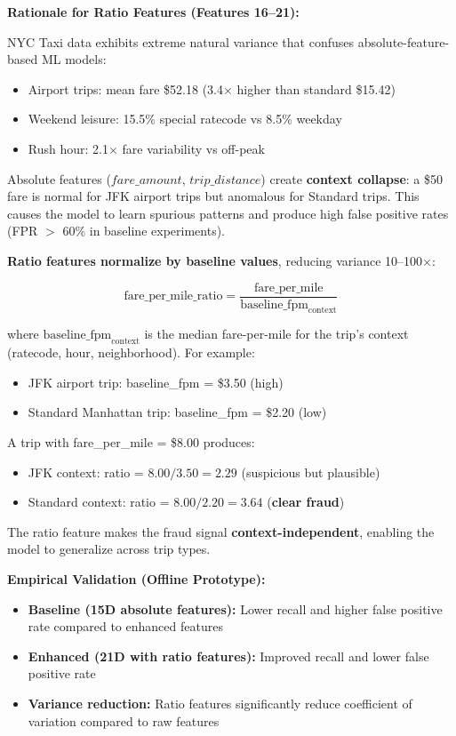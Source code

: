 \textbf{Rationale for Ratio Features (Features 16--21):}

NYC Taxi data exhibits extreme natural variance that confuses absolute-feature-based ML models:
\begin{itemize}
    \item Airport trips: mean fare \$52.18 (3.4$\times$ higher than standard \$15.42)
    \item Weekend leisure: 15.5\% special ratecode vs 8.5\% weekday
    \item Rush hour: 2.1$\times$ fare variability vs off-peak
\end{itemize}

Absolute features ($fare\_amount$, $trip\_distance$) create \textbf{context collapse}: a \$50 fare is normal for JFK airport trips but anomalous for Standard trips. This causes the model to learn spurious patterns and produce high false positive rates (FPR $>$ 60\% in baseline experiments).

\textbf{Ratio features normalize by baseline values}, reducing variance 10--100$\times$:

\begin{equation}
\text{fare\_per\_mile\_ratio} = \frac{\text{fare\_per\_mile}}{\text{baseline\_fpm}_{\text{context}}}
\end{equation}

where $\text{baseline\_fpm}_{\text{context}}$ is the median fare-per-mile for the trip's context (ratecode, hour, neighborhood). For example:
\begin{itemize}
    \item JFK airport trip: baseline\_fpm = \$3.50 (high)
    \item Standard Manhattan trip: baseline\_fpm = \$2.20 (low)
\end{itemize}

A trip with fare\_per\_mile = \$8.00 produces:
\begin{itemize}
    \item JFK context: ratio = $8.00 / 3.50 = 2.29$ (suspicious but plausible)
    \item Standard context: ratio = $8.00 / 2.20 = 3.64$ (\textbf{clear fraud})
\end{itemize}

The ratio feature makes the fraud signal \textbf{context-independent}, enabling the model to generalize across trip types.

\textbf{Empirical Validation (Offline Prototype):}
\begin{itemize}
    \item \textbf{Baseline (15D absolute features):} Lower recall and higher false positive rate compared to enhanced features
    \item \textbf{Enhanced (21D with ratio features):} Improved recall and lower false positive rate
    \item \textbf{Variance reduction:} Ratio features significantly reduce coefficient of variation compared to raw features
\end{itemize}

